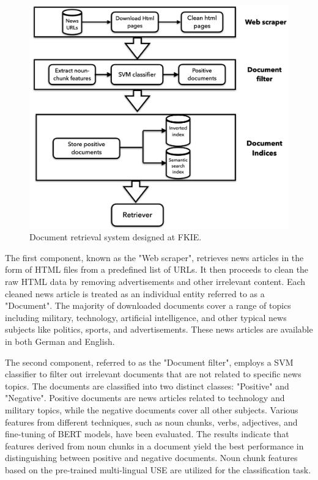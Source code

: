 \begin{figure}[h]
	\centering
	\includegraphics[width=.9\textwidth]{images/thesis_images/background.png}
	\caption[Existing work developed at FKIE.]{Document retrieval system designed at FKIE. \label{fig:background_image}}
\end{figure}

The first component, known as the "Web scraper", retrieves news articles in the form of HTML files from a predefined list of URLs. It then proceeds to clean the raw HTML data by removing advertisements and other irrelevant content. Each cleaned news article is treated as an individual entity referred to as a "Document". The majority of downloaded documents cover a range of topics including military, technology, artificial intelligence, and other typical news subjects like politics, sports, and advertisements. These news articles are available in both German and English.

The second component, referred to as the "Document filter", employs a \ac{SVM} classifier to filter out irrelevant documents that are not related to specific news topics. The documents are classified into two distinct classes: "Positive" and "Negative". Positive documents are news articles related to technology and military topics, while the negative documents cover all other subjects. Various features from different techniques, such as noun chunks, verbs, adjectives, and fine-tuning of \ac{BERT} models, have been evaluated. The results indicate that features derived from noun chunks in a document yield the best performance in distinguishing between positive and negative documents. Noun chunk features based on the pre-trained multi-lingual \ac{USE} are utilized for the classification task.

